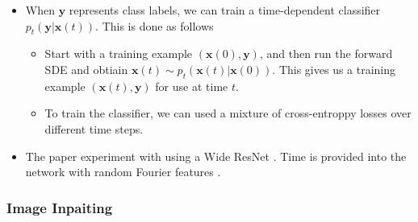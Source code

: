 \documentclass[10pt]{article}
\newcommand{\ve}[1]{\mathbf{#1}}
\begin{document}
\begin{itemize}
  \item When $\ve{y}$ represents class labels, we can train a time-dependent classifier $p_t(\ve{y}|\ve{x}(t))$. This is done as follows
  \begin{itemize}
    \item Start with a training example $(\ve{x}(0), \ve{y})$, and then run the forward SDE and obtiain $\ve{x}(t) \sim p_t(\ve{x}(t)|\ve{x}(0))$. This gives us a training example $(\ve{x}(t),\ve{y})$ for use at time $t$.
    
    \item To train the classifier, we can used a mixture of cross-entroppy losses over different time steps.
  \end{itemize}

  \item The paper experiment with using a Wide ResNet \cite{Zagoruyko:2018}. Time is provided into the network with random Fourier features \cite{Tancik:2020}.
\end{itemize}

\subsubsection{Image Inpaiting}
\end{document}
